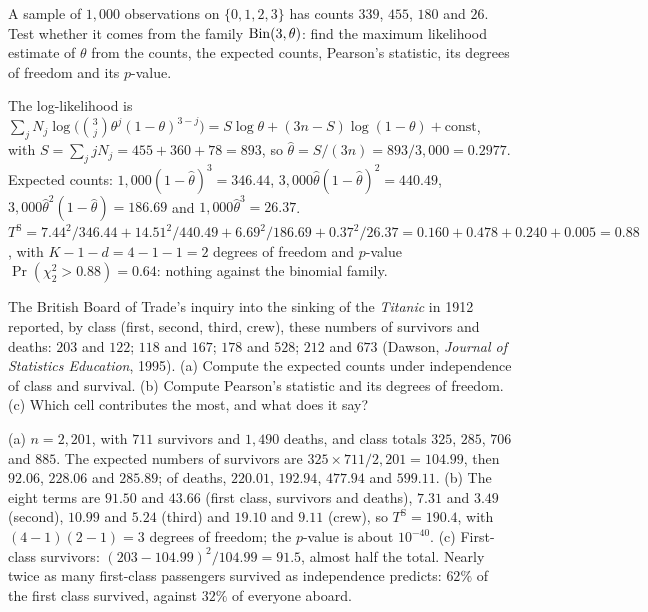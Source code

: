 \begin{exercise}
\label{ex:gof-binomial}
A sample of $1{,}000$ observations on $\{0, 1, 2, 3\}$ has counts $339$, $455$, $180$ and $26$. Test whether it comes from the family $\mathrm{Bin}(3, \theta)$: find the maximum likelihood estimate of $\theta$ from the counts, the expected counts, Pearson's statistic, its degrees of freedom and its $p$-value.
\end{exercise}
\begin{solution}
The log-likelihood is $\sum_jN_j\log\big(\binom{3}{j}\theta^j(1 - \theta)^{3 - j}\big) = S\log\theta + (3n - S)\log(1 - \theta) + \text{const}$, with $S = \sum_j jN_j = 455 + 360 + 78 = 893$, so $\hat{\theta} = S/(3n) = 893/3{,}000 = 0.2977$. Expected counts: $1{,}000(1 - \hat{\theta})^3 = 346.44$, $3{,}000\hat{\theta}(1 - \hat{\theta})^2 = 440.49$, $3{,}000\hat{\theta}^2(1 - \hat{\theta}) = 186.69$ and $1{,}000\hat{\theta}^3 = 26.37$. $T^{\mathrm{S}} = 7.44^2/346.44 + 14.51^2/440.49 + 6.69^2/186.69 + 0.37^2/26.37 = 0.160 + 0.478 + 0.240 + 0.005 = 0.88$, with $K - 1 - d = 4 - 1 - 1 = 2$ degrees of freedom and $p$-value $\Pr(\chi^2_2 > 0.88) = 0.64$: nothing against the binomial family.
\end{solution}

\begin{exercise}
\label{ex:gof-titanic}
The British Board of Trade's inquiry into the sinking of the \textit{Titanic} in 1912 reported, by class (first, second, third, crew), these numbers of survivors and deaths: $203$ and $122$; $118$ and $167$; $178$ and $528$; $212$ and $673$ (Dawson, \textit{Journal of Statistics Education}, 1995). (a) Compute the expected counts under independence of class and survival. (b) Compute Pearson's statistic and its degrees of freedom. (c) Which cell contributes the most, and what does it say?
\end{exercise}
\begin{solution}
(a) $n = 2{,}201$, with $711$ survivors and $1{,}490$ deaths, and class totals $325$, $285$, $706$ and $885$. The expected numbers of survivors are $325 \times 711/2{,}201 = 104.99$, then $92.06$, $228.06$ and $285.89$; of deaths, $220.01$, $192.94$, $477.94$ and $599.11$. (b) The eight terms are $91.50$ and $43.66$ (first class, survivors and deaths), $7.31$ and $3.49$ (second), $10.99$ and $5.24$ (third) and $19.10$ and $9.11$ (crew), so $T^{\mathrm{S}} = 190.4$, with $(4 - 1)(2 - 1) = 3$ degrees of freedom; the $p$-value is about $10^{-40}$. (c) First-class survivors: $(203 - 104.99)^2/104.99 = 91.5$, almost half the total. Nearly twice as many first-class passengers survived as independence predicts: $62\%$ of the first class survived, against $32\%$ of everyone aboard.
\end{solution}

